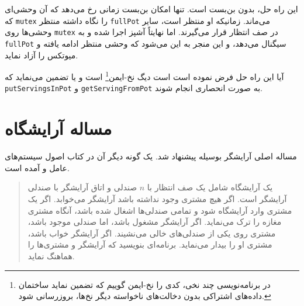 \documentclass{book}
\newcommand{\clearemptydoublepage}{\newpage\cleardoublepage}
\begin{document}
    این راه حل، بدون بن‌بست است. تنها امکان بن‌بست زمانی رخ می‌دهد که آن وحشی‌ای که {\tt mutex}  را نگاه داشته منتظر {\tt fullPot} می‌ماند. 
    زمانیکه او منتظر است، سایر وحشی‌ها روی {\tt mutex} در صف انتظار قرار می‌گیرند. اما نهایتاً آشپز اجرا شده و به {\tt fullPot} سیگنال می‌دهد، 
    و این منجر به این می‌شود که  وحشی منتظر ادامه یافته و میوتکس را آزاد نماید. 
    

    آیا این راه حل فرض نموده است است دیگ نخ-ایمن\footnote{
    در برنامه‌نویسی چند نخی، کدی را نخ-ایمن گوییم که تضمین نماید ساختمان داده‌های اشتراکی بدون دخالت‌های ناخواسته دیگر نخ‌ها، بروزرسانی شود. 
    }  است و یا تضمین می‌نماید که  {\tt putServingsInPot} و {\tt getServingFromPot} 
    به صورت انحصاری انجام شوند.


\clearemptydoublepage
\section{مساله آرایشگاه}

    مساله اصلی آرایشگر بوسیله  پیشنهاد شد. یک گونه دیگر آن در کتاب اصول سیستم‌های عامل  و 
    آمده است. 

\begin {quotation}
    یک آرایشگاه شامل یک صف انتظار با $n$ صندلی و اتاق آرایشگر با صندلی آرایشگر است. اگر هیچ مشتری وجود نداشته باشد 
    آرایشگر می‌خوابد. اگر یک مشتری وارد آرایشگاه شود و تمامی صندلی‌ها اشغال شده باشد، آنگاه مشتری مغازه را ترک می‌نماید. 
    اگر آرایشگر مشغول باشد، اما صندلی موجود باشد، مشتری روی یکی از صندلی‌های خالی می‌نشیند. اگر آرایشگر خواب باشد، مشتری او را بیدار می‌نماید. 
    برنامه‌ای بنویسید که آرایشگر و مشتری‌ها را هماهنگ نماید. 
\end{quotation}
\end{document}
